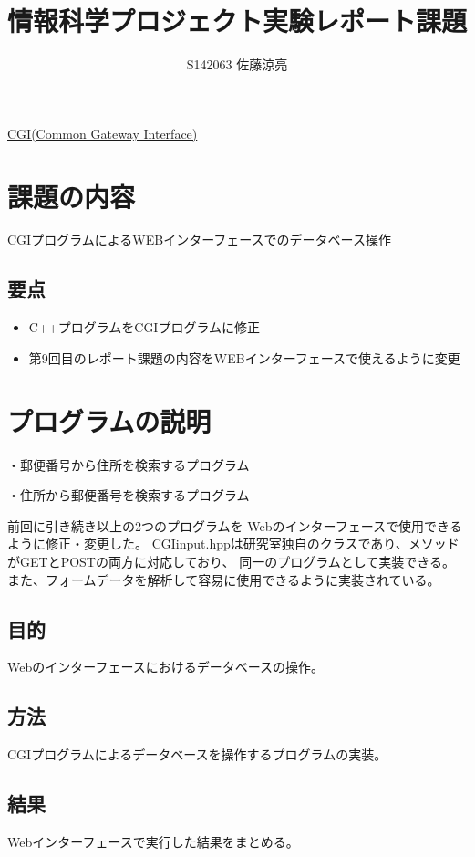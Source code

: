 \documentclass[a4j]{jarticle}
\title{情報科学プロジェクト実験レポート課題}
\author{S142063 佐藤涼亮}
\begin{document}
\maketitle
\centerline{\LARGE \underline{CGI(Common Gateway Interface)}}
\section{課題の内容}
{\large \underline{CGIプログラムによるWEBインターフェースでのデータベース操作}}
\subsection{要点}
\begin{itemize}
\item C++プログラムをCGIプログラムに修正
\item 第9回目のレポート課題の内容をWEBインターフェースで使えるように変更
\end{itemize}
\section{プログラムの説明}
・郵便番号から住所を検索するプログラム

・住所から郵便番号を検索するプログラム

前回に引き続き以上の2つのプログラムを
Webのインターフェースで使用できるように修正・変更した。
CGIinput.hppは研究室独自のクラスであり、メソッドがGETとPOSTの両方に対応しており、
同一のプログラムとして実装できる。
また、フォームデータを解析して容易に使用できるように実装されている。

\subsection{目的}
Webのインターフェースにおけるデータベースの操作。

\subsection{方法}
CGIプログラムによるデータベースを操作するプログラムの実装。

\subsection{結果}
Webインターフェースで実行した結果をまとめる。
\end{document}
